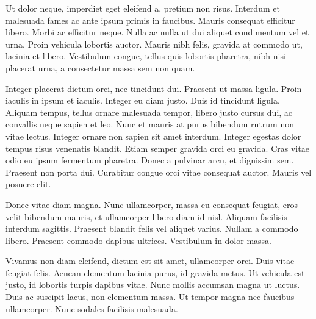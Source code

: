 Ut dolor neque, imperdiet eget eleifend a, pretium non risus. Interdum et malesuada fames ac ante ipsum primis in faucibus. Mauris consequat efficitur libero. Morbi ac efficitur neque. Nulla ac nulla ut dui aliquet condimentum vel et urna. Proin vehicula lobortis auctor. Mauris nibh felis, gravida at commodo ut, lacinia et libero. Vestibulum congue, tellus quis lobortis pharetra, nibh nisi placerat urna, a consectetur massa sem non quam.

Integer placerat dictum orci, nec tincidunt dui. Praesent ut massa ligula. Proin iaculis in ipsum et iaculis. Integer eu diam justo. Duis id tincidunt ligula. Aliquam tempus, tellus ornare malesuada tempor, libero justo cursus dui, ac convallis neque sapien et leo. Nunc et mauris at purus bibendum rutrum non vitae lectus. Integer ornare non sapien sit amet interdum. Integer egestas dolor tempus risus venenatis blandit. Etiam semper gravida orci eu gravida. Cras vitae odio eu ipsum fermentum pharetra. Donec a pulvinar arcu, et dignissim sem. Praesent non porta dui. Curabitur congue orci vitae consequat auctor. Mauris vel posuere elit.

Donec vitae diam magna. Nunc ullamcorper, massa eu consequat feugiat, eros velit bibendum mauris, et ullamcorper libero diam id nisl. Aliquam facilisis interdum sagittis. Praesent blandit felis vel aliquet varius. Nullam a commodo libero. Praesent commodo dapibus ultrices. Vestibulum in dolor massa.

Vivamus non diam eleifend, dictum est sit amet, ullamcorper orci. Duis vitae feugiat felis. Aenean elementum lacinia purus, id gravida metus. Ut vehicula est justo, id lobortis turpis dapibus vitae. Nunc mollis accumsan magna ut luctus. Duis ac suscipit lacus, non elementum massa. Ut tempor magna nec faucibus ullamcorper. Nunc sodales facilisis malesuada.
